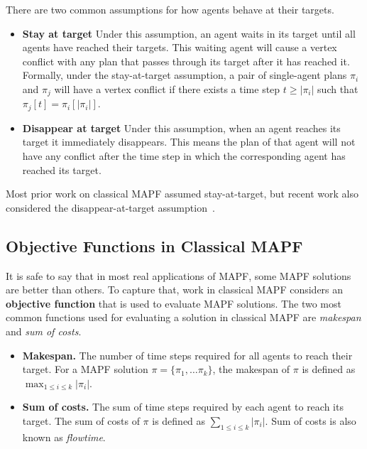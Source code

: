 \documentclass[letterpaper]{article} %
\newcommand{\comment}[1]{{\nb{\textbf{Comment:}}{orange}{#1}}}
\begin{document}
There are two common assumptions for how agents behave at their targets.
\begin{itemize}
\item \textbf{Stay at target} Under this assumption, 
an agent waits in its target until all agents have reached their targets. 
This waiting agent will cause a vertex conflict with any plan that passes through
its target after it has reached it. 
Formally, under the stay-at-target assumption, 
a pair of single-agent plans $\pi_i$ and $\pi_j$ will have a vertex conflict 
if there exists a time step $t\geq |\pi_i|$ such that $\pi_j[t]=\pi_i[|\pi_i|]$.
\item \textbf{Disappear at target} Under this assumption, 
when an agent reaches its target it immediately disappears. 
This means the plan of that agent will not have any conflict after 
the time step in which the corresponding agent has reached its target. 
\end{itemize}
Most prior work on classical MAPF assumed stay-at-target, but recent work also considered the disappear-at-target assumption~\cite{MaAAAI19a}.

\subsection{Objective Functions in Classical MAPF}
It is safe to say that in most real applications of MAPF, 
some MAPF solutions are better than others. 
To capture that, work in classical MAPF considers an \textbf{objective function}
that is used to evaluate MAPF solutions. 
The two most common functions used for evaluating a solution in classical MAPF are \emph{makespan} and \emph{sum of costs}. 
\begin{itemize}
\item \textbf{Makespan.} The number of time steps required for all agents to reach their target. 
For a MAPF solution $\pi=\{\pi_1, \ldots \pi_k\}$, the makespan of $\pi$ is defined as $\max_{1\leq i\leq k} |\pi_i|$. 
\item \textbf{Sum of costs.} The sum of time steps required by each agent to reach its target. The sum of costs of $\pi$ is defined as $\sum_{1\leq i\leq k} |\pi_i|$. 
Sum of costs is also known as \emph{flowtime}.
\end{itemize}
\end{document}
